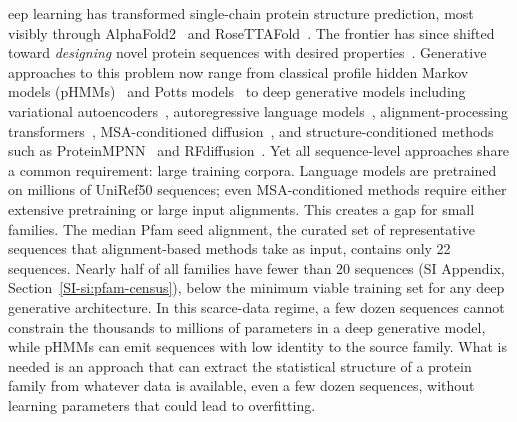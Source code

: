 \documentclass[11pt,onecolumn,twoside,lineno]{pnas-new}
\begin{document}
eep learning has transformed single-chain protein structure prediction, most visibly through AlphaFold2~\cite{jumperHighlyAccurateProtein2021} and RoseTTAFold~\cite{baekRoseTTAFold2021}. The frontier has since shifted toward \emph{designing} novel protein sequences with desired properties~\cite{kuhlmanBradleyAdvances2019,huangComingAgeDeNovo2016}. Generative approaches to this problem now range from classical profile hidden Markov models (pHMMs)~\cite{hmmer3,kroghHiddenMarkovModels1994} and Potts models~\cite{morcosDirectCouplingAnalysis2011,ekeberg2013improved,trinquierEfficientGenerativeModeling2021} to deep generative models including variational autoencoders~\cite{kingmaWellingAutoEncoding2014,riesselman2018deep}, autoregressive language models~\cite{ferruzProtGPT2DeepUnsupervised2022,madaniProGenLanguageModeling2023}, alignment-processing transformers~\cite{raoMSATransformer2021}, MSA-conditioned diffusion~\cite{alamdariProteinGeneration2023}, and structure-conditioned methods such as ProteinMPNN~\cite{dauparasProteinMPNN2022} and RFdiffusion~\cite{watsonRFdiffusion2023}. Yet all sequence-level approaches share a common requirement: large training corpora. Language models are pretrained on millions of UniRef50 sequences; even MSA-conditioned methods require either extensive pretraining or large input alignments. This creates a gap for small families. The median Pfam seed alignment, the curated set of representative sequences that alignment-based methods take as input, contains only 22 sequences. Nearly half of all families have fewer than 20 sequences (SI Appendix, Section~\ref{SI-si:pfam-census}), below the minimum viable training set for any deep generative architecture. In this scarce-data regime, a few dozen sequences cannot constrain the thousands to millions of parameters in a deep generative model, while pHMMs can emit sequences with low identity to the source family. What is needed is an approach that can extract the statistical structure of a protein family from whatever data is available, even a few dozen sequences, without learning parameters that could lead to overfitting.
\end{document}
